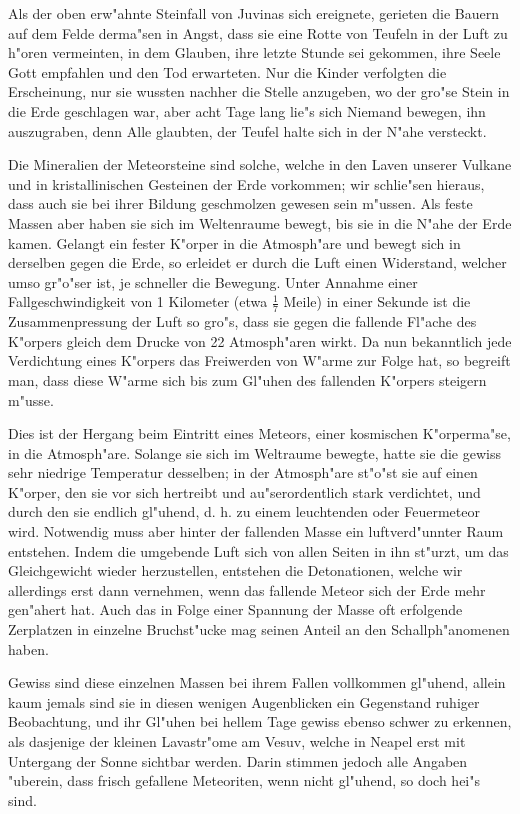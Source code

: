 \documentclass[a4paper, 11pt, oneside, german]{article}
\begin{document}
Als der oben erw"ahnte Steinfall von Juvinas sich ereignete, gerieten die Bauern auf dem Felde derma"sen in Angst, dass sie eine Rotte von Teufeln in der Luft zu h"oren vermeinten, in dem Glauben, ihre letzte Stunde sei gekommen, ihre Seele Gott empfahlen und den Tod erwarteten. Nur die Kinder verfolgten die Erscheinung, nur sie wussten nachher die Stelle anzugeben, wo der gro"se Stein in die Erde geschlagen war, aber acht Tage lang lie"s sich Niemand bewegen, ihn auszugraben, denn Alle glaubten, der Teufel halte sich in der N"ahe versteckt.

Die Mineralien der Meteorsteine sind solche, welche in den Laven unserer Vulkane und in kristallinischen Gesteinen der Erde vorkommen; wir schlie"sen hieraus, dass auch sie bei ihrer Bildung geschmolzen gewesen sein m"ussen. Als feste Massen aber haben sie sich im Weltenraume bewegt, bis sie in die N"ahe der Erde kamen. Gelangt ein fester K"orper in die Atmosph"are und bewegt sich in derselben gegen die Erde, so erleidet er durch die Luft einen Widerstand, welcher umso gr"o"ser ist, je schneller die Bewegung. Unter Annahme einer Fallgeschwindigkeit von 1 Kilometer (etwa $\frac{1}{7}$ Meile) in einer Sekunde ist die Zusammenpressung der Luft so gro"s, dass sie gegen die fallende Fl"ache des K"orpers gleich dem Drucke von 22 Atmosph"aren wirkt. Da nun bekanntlich jede Verdichtung eines K"orpers das Freiwerden von W"arme zur Folge hat, so begreift man, dass diese W"arme sich bis zum Gl"uhen des fallenden K"orpers steigern m"usse.

Dies ist der Hergang beim Eintritt eines Meteors, einer kosmischen K"orperma"se, in die Atmosph"are. Solange sie sich im Weltraume bewegte, hatte sie die gewiss sehr niedrige Temperatur desselben; in der Atmosph"are st"o"st sie auf einen K"orper, den sie vor sich hertreibt und au"serordentlich stark verdichtet, und durch den sie endlich gl"uhend, d. h. zu einem leuchtenden oder Feuermeteor wird. Notwendig muss aber hinter der fallenden Masse ein luftverd"unnter Raum entstehen. Indem die umgebende Luft sich von allen Seiten in ihn st"urzt, um das Gleichgewicht wieder herzustellen, entstehen die Detonationen, welche wir allerdings erst dann vernehmen, wenn das fallende Meteor sich der Erde mehr gen"ahert hat. Auch das in Folge einer Spannung der Masse oft erfolgende Zerplatzen in einzelne Bruchst"ucke mag seinen Anteil an den Schallph"anomenen haben.

Gewiss sind diese einzelnen Massen bei ihrem Fallen vollkommen gl"uhend, allein kaum jemals sind sie in diesen wenigen Augenblicken ein Gegenstand ruhiger Beobachtung, und ihr Gl"uhen bei hellem Tage gewiss ebenso schwer zu erkennen, als dasjenige der kleinen Lavastr"ome am Vesuv, welche in Neapel erst mit Untergang der Sonne sichtbar werden. Darin stimmen jedoch alle Angaben "uberein, dass frisch gefallene Meteoriten, wenn nicht gl"uhend, so doch hei"s sind.
\end{document}
